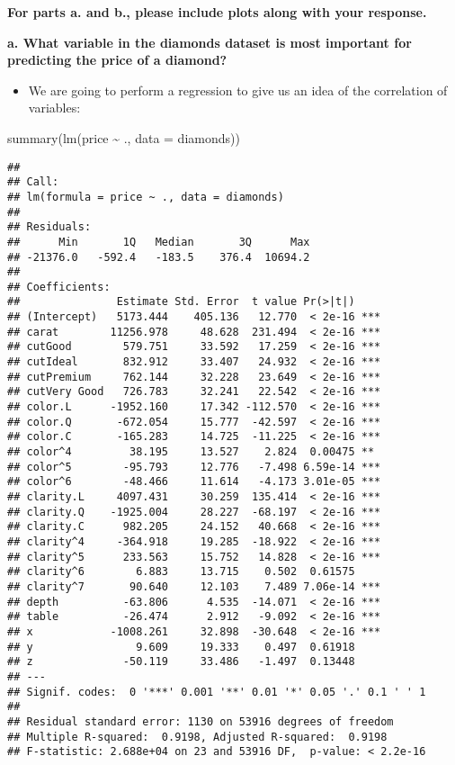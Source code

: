 \documentclass[
]{article}
\newenvironment{Shaded}{\begin{snugshade}}{\end{snugshade}}
\newcommand{\AttributeTok}[1]{\textcolor[rgb]{0.77,0.63,0.00}{#1}}
\newcommand{\FunctionTok}[1]{\textcolor[rgb]{0.00,0.00,0.00}{#1}}
\newcommand{\NormalTok}[1]{#1}
\newcommand{\SpecialCharTok}[1]{\textcolor[rgb]{0.00,0.00,0.00}{#1}}
\providecommand{\tightlist}{%
  \setlength{\itemsep}{0pt}\setlength{\parskip}{0pt}}
\begin{document}
\textbf{For parts a. and b., please include plots along with your
response.}

\textbf{a. What variable in the diamonds dataset is most important for
predicting the price of a diamond?}

\begin{itemize}
\tightlist
\item
  We are going to perform a regression to give us an idea of the
  correlation of variables:
\end{itemize}

\begin{Shaded}
\begin{Highlighting}[]
\FunctionTok{summary}\NormalTok{(}\FunctionTok{lm}\NormalTok{(price }\SpecialCharTok{\textasciitilde{}}\NormalTok{ ., }\AttributeTok{data =}\NormalTok{ diamonds))}
\end{Highlighting}
\end{Shaded}

\begin{verbatim}
## 
## Call:
## lm(formula = price ~ ., data = diamonds)
## 
## Residuals:
##      Min       1Q   Median       3Q      Max 
## -21376.0   -592.4   -183.5    376.4  10694.2 
## 
## Coefficients:
##               Estimate Std. Error  t value Pr(>|t|)    
## (Intercept)   5173.444    405.136   12.770  < 2e-16 ***
## carat        11256.978     48.628  231.494  < 2e-16 ***
## cutGood        579.751     33.592   17.259  < 2e-16 ***
## cutIdeal       832.912     33.407   24.932  < 2e-16 ***
## cutPremium     762.144     32.228   23.649  < 2e-16 ***
## cutVery Good   726.783     32.241   22.542  < 2e-16 ***
## color.L      -1952.160     17.342 -112.570  < 2e-16 ***
## color.Q       -672.054     15.777  -42.597  < 2e-16 ***
## color.C       -165.283     14.725  -11.225  < 2e-16 ***
## color^4         38.195     13.527    2.824  0.00475 ** 
## color^5        -95.793     12.776   -7.498 6.59e-14 ***
## color^6        -48.466     11.614   -4.173 3.01e-05 ***
## clarity.L     4097.431     30.259  135.414  < 2e-16 ***
## clarity.Q    -1925.004     28.227  -68.197  < 2e-16 ***
## clarity.C      982.205     24.152   40.668  < 2e-16 ***
## clarity^4     -364.918     19.285  -18.922  < 2e-16 ***
## clarity^5      233.563     15.752   14.828  < 2e-16 ***
## clarity^6        6.883     13.715    0.502  0.61575    
## clarity^7       90.640     12.103    7.489 7.06e-14 ***
## depth          -63.806      4.535  -14.071  < 2e-16 ***
## table          -26.474      2.912   -9.092  < 2e-16 ***
## x            -1008.261     32.898  -30.648  < 2e-16 ***
## y                9.609     19.333    0.497  0.61918    
## z              -50.119     33.486   -1.497  0.13448    
## ---
## Signif. codes:  0 '***' 0.001 '**' 0.01 '*' 0.05 '.' 0.1 ' ' 1
## 
## Residual standard error: 1130 on 53916 degrees of freedom
## Multiple R-squared:  0.9198, Adjusted R-squared:  0.9198 
## F-statistic: 2.688e+04 on 23 and 53916 DF,  p-value: < 2.2e-16
\end{verbatim}
\end{document}
